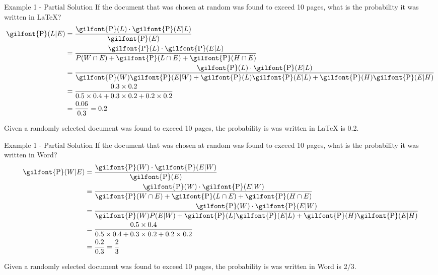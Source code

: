 \documentclass[
  ignorenonframetext,
]{beamer}
\begin{document}
\begin{frame}{Example 1 - Partial Solution}
\label{example-1---partial-solution-1}
If the document that was chosen at random was found to exceed 10 pages,
what is the probability it was written in LaTeX? \[
\begin{aligned}
\textrm{\gilfont{P}}\normalfont (L | E) &= \frac{\textrm{\gilfont{P}}\normalfont (L)\cdot \textrm{\gilfont{P}}\normalfont (E|L)}{\textrm{\gilfont{P}}\normalfont (E)}\\
&=\frac{\textrm{\gilfont{P}}\normalfont (L)\cdot \textrm{\gilfont{P}}\normalfont (E|L)}{P(W \cap E) + \textrm{\gilfont{P}}\normalfont (L\cap E) + \textrm{\gilfont{P}}\normalfont (H \cap E)}\\
&=\frac{\textrm{\gilfont{P}}\normalfont (L)\cdot \textrm{\gilfont{P}}\normalfont (E|L)}{\textrm{\gilfont{P}}\normalfont (W)\textrm{\gilfont{P}}\normalfont (E|W) + \textrm{\gilfont{P}}\normalfont (L)\textrm{\gilfont{P}}\normalfont (E|L) + \textrm{\gilfont{P}}\normalfont (H)\textrm{\gilfont{P}}\normalfont (E|H)}\\
&=\frac{0.3 \times 0.2}{0.5 \times 0.4 + 0.3 \times 0.2 + 0.2 \times 0.2} \\
&=\frac{0.06}{0.3}= 0.2
\end{aligned}
\]

\begin{tcolorbox}
Given a randomly selected document was found to exceed 10 pages, the probability is was written in LaTeX is 0.2.
\end{tcolorbox}
\end{frame}

\begin{frame}{Example 1 - Partial Solution}
\label{example-1---partial-solution-2}
If the document that was chosen at random was found to exceed 10 pages,
what is the probability it was written in Word? \[
\begin{aligned}
\textrm{\gilfont{P}}\normalfont (W | E) &= \frac{\textrm{\gilfont{P}}\normalfont (W)\cdot \textrm{\gilfont{P}}\normalfont (E|W)}{\textrm{\gilfont{P}}\normalfont (E)}\\
&=\frac{\textrm{\gilfont{P}}\normalfont (W)\cdot \textrm{\gilfont{P}}\normalfont (E|W)}{\textrm{\gilfont{P}}\normalfont (W \cap E) + \textrm{\gilfont{P}}\normalfont (L\cap E) + \textrm{\gilfont{P}}\normalfont (H \cap E)}\\
&=\frac{\textrm{\gilfont{P}}\normalfont (W)\cdot \textrm{\gilfont{P}}\normalfont (E|W)}{\textrm{\gilfont{P}}\normalfont (W)P(E|W) + \textrm{\gilfont{P}}\normalfont (L)\textrm{\gilfont{P}}\normalfont (E|L) + \textrm{\gilfont{P}}\normalfont (H)\textrm{\gilfont{P}}\normalfont (E|H)}\\
&=\frac{0.5 \times 0.4}{0.5 \times 0.4 + 0.3 \times 0.2 + 0.2 \times 0.2} \\
&=\frac{0.2}{0.3}= \frac{2}{3}
\end{aligned}
\]

\begin{tcolorbox}
Given a randomly selected document was found to exceed 10 pages, the probability is was written in Word is 2/3.
\end{tcolorbox}
\end{frame}
\end{document}
